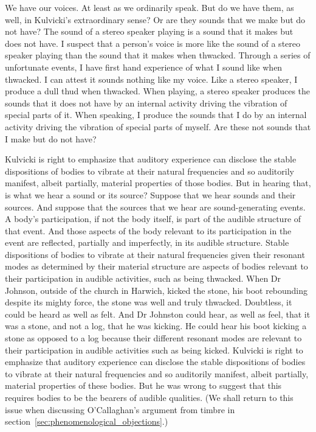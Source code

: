 We have our voices. At least as we ordinarily speak. But do we have them, as well, in Kulvicki's extraordinary sense? Or are they sounds that we make but do not have? The sound of a stereo speaker playing is a sound that it makes but does not have. I suspect that a person's voice is more like the sound of a stereo speaker playing than the sound that it makes when thwacked. Through a series of unfortunate events, I have first hand experience of what I sound like when thwacked. I can attest it sounds nothing like my voice. Like a stereo speaker, I produce a dull thud when thwacked. When playing, a stereo speaker produces the sounds that it does not have by an internal activity driving the vibration of special parts of it. When speaking, I produce the sounds that I do by an internal activity driving the vibration of special parts of myself. Are these not sounds that I make but do not have?

Kulvicki is right to emphasize that auditory experience can disclose the stable dispositions of bodies to vibrate at their natural frequencies and so auditorily manifest, albeit partially, material properties of those bodies. But in hearing that, is what we hear a sound or its source? Suppose that we hear sounds and their sources. And suppose that the sources that we hear are sound-generating events. A body's participation, if not the body itself, is part of the audible structure of that event. And those aspects of the body relevant to its participation in the event are reflected, partially and imperfectly, in its audible structure. Stable dispositions of bodies to vibrate at their natural frequencies given their resonant modes as determined by their material structure are aspects of bodies relevant to their participation in audible activities, such as being thwacked. When Dr Johnson, outside of the church in Harwich, kicked the stone, his boot rebounding despite its mighty force, the stone was well and truly thwacked. Doubtless, it could be heard as well as felt. And Dr Johnston could hear, as well as feel, that it was a stone, and not a log, that he was kicking. He could hear his boot kicking a stone as opposed to a log because their different resonant modes are relevant to their participation in audible activities such as being kicked. Kulvicki is right to emphasize that auditory experience can disclose the stable dispositions of bodies to vibrate at their natural frequencies and so auditorily manifest, albeit partially, material properties of these bodies. But he was wrong to suggest that this requires bodies to be the bearers of audible qualities. (We shall return to this issue when discussing O'Callaghan's argument from timbre in section~\ref{sec:phenomenological_objections}.)  

